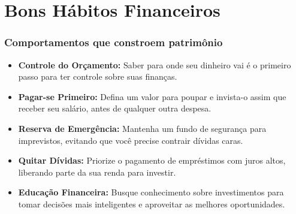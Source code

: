 \section{Bons Hábitos Financeiros}

\begin{frame}[c]\frametitle{Comportamentos que constroem patrimônio}
  \begin{itemize}
    \item \textbf{Controle do Orçamento:} Saber para onde seu dinheiro vai é o primeiro passo para ter controle sobre suas finanças.
    \item \textbf{Pagar-se Primeiro:} Defina um valor para poupar e invista-o assim que receber seu salário, antes de qualquer outra despesa.
    \item \textbf{Reserva de Emergência:} Mantenha um fundo de segurança para imprevistos, evitando que você precise contrair dívidas caras.
    \item \textbf{Quitar Dívidas:} Priorize o pagamento de empréstimos com juros altos, liberando parte da sua renda para investir.
    \item \textbf{Educação Financeira:} Busque conhecimento sobre investimentos para tomar decisões mais inteligentes e aproveitar as melhores oportunidades.
  \end{itemize}
\end{frame}